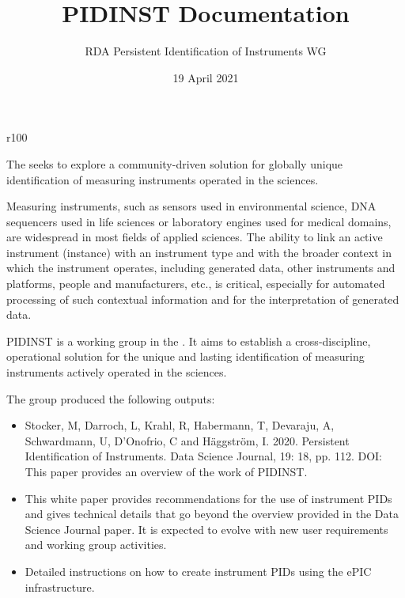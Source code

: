 \documentclass[a4paper,10pt,english]{sphinxmanual}
\title{PIDINST Documentation}
\date{19 April 2021}
\author{RDA Persistent Identification of Instruments WG}
\let\sphinxpxdimen\pdfpxdimen\else\newdimen\sphinxpxdimen
\begin{document}
\pagestyle{empty}
\sphinxmaketitle

\pagestyle{plain}
\label{\detokenize{index::doc}}
\begin{wrapfigure}{r}{100\sphinxpxdimen}
  \sphinxincludegraphics[width=100\sphinxpxdimen]{{pidinst-logo}.pdf}
\end{wrapfigure}
The  seeks to explore a community-driven solution for globally
unique identification of measuring instruments operated in the
sciences.

Measuring instruments, such as sensors used in environmental science,
DNA sequencers used in life sciences or laboratory engines used for
medical domains, are widespread in most fields of applied sciences.
The ability to link an active instrument (instance) with an instrument
type and with the broader context in which the instrument operates,
including generated data, other instruments and platforms, people and
manufacturers, etc., is critical, especially for automated processing
of such contextual information and for the interpretation of generated
data.

PIDINST is a working group in the .  It aims to establish a cross-discipline, operational
solution for the unique and lasting identification of measuring
instruments actively operated in the sciences.

The group produced the following outputs:
\begin{itemize}
\item {} 
Stocker, M, Darroch, L, Krahl, R, Habermann, T, Devaraju, A,
Schwardmann, U, D’Onofrio, C and Häggström, I.  2020.  Persistent
Identification of Instruments.  Data Science Journal, 19: 18,
pp. 1\textendash{}12.  DOI:  
This paper provides an overview of the work of PIDINST.

\item {} 
{\hyperref[\detokenize{white-paper/index:white-paper}]{}} 
This white paper provides recommendations for the use of instrument
PIDs and gives technical details that go beyond the overview
provided in the Data Science Journal paper.  It is expected to
evolve with new user requirements and working group activities.

\item {} 
{\hyperref[\detokenize{cookbook/index:epic-cookbook}]{}} 
Detailed instructions on how to create instrument PIDs using the
ePIC infrastructure.

\end{itemize}
\bigskip
\end{document}
